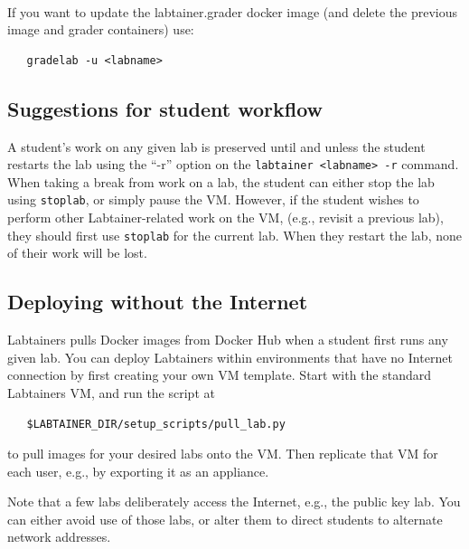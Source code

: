 \documentclass[12pt]{article}
\begin{document}
\noindent \\If you want to update the labtainer.grader docker image (and delete the previous image and grader containers) use:
\begin{verbatim}
   gradelab -u <labname>
\end{verbatim}


\subsection{Suggestions for student workflow}
A student's work on any given lab is preserved until and unless the student restarts the lab using the ``-r'' 
option on the {\tt labtainer <labname> -r} command.  When taking a break from work on a lab, the student can
either stop the lab using {\tt stoplab}, or simply pause the VM.  However, if the student wishes to perform other
Labtainer-related work on the VM, (e.g., revisit a previous lab), they should first use {\tt stoplab} for the current
lab.  When they restart the lab, none of their work will be lost.

\subsection{Deploying without the Internet}
Labtainers pulls Docker images from Docker Hub when a student first runs any given lab.  You can deploy
Labtainers within environments that have no Internet connection by first creating your own 
VM template.  Start with the standard Labtainers VM, and run the script at 
\begin{verbatim}
   $LABTAINER_DIR/setup_scripts/pull_lab.py
\end{verbatim}
\noindent to pull images for your desired labs onto the VM.  Then replicate that VM for each user, e.g., by
exporting it as an appliance.

Note that a few labs deliberately access the Internet, e.g., the public key lab.  You can either avoid use
of those labs, or alter them to direct students to alternate network addresses.
\end{document}
